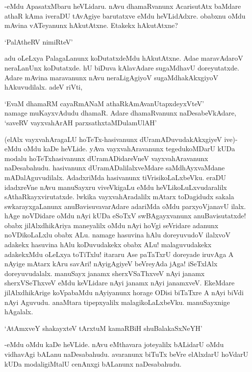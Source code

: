 -eMdu ApasatxMbaru heVLidaru. nAvu dhamaRvanunx AcarisutAtx baMdare athaR kAma iveraDU tAvAgiye barutatxve eMdu heVLidAdxre. obabxnu oMdu mAvina vATeyanunx hAkutAtxne. Etakekx hAkutAtxne?

\begin{shloka}
`PalAtheRV nimiRteV'
\end{shloka}

adu oLeLxya PalagaLanunx koDutatxdeMdu hAkutAtxne. Adae maravAdaroV neraLanUnx koDutatxde. hU biDuva kAlavAdare sugaMdhavU doreyutatxde. Adare mAvina maravanunx nAvu neraLigAgiyoV sugaMdhakAkxgiyoV hAkuvudilalx. adeV riVti,

\begin{shloka}
`EvaM dhamaRM cayaRmANaM athaRkAmAvanUtapxdeyxVteV'\\
namage muKayxvAdudu dhamaR. Adare dhamaRvanunx naDesabeVkAdare,\\
`saveRV vayxvahArAH parxsathxtaMDulamUlAH'
\end{shloka}

(elAlx vayxvahAragaLU hoTeTx-hasivanunx dUramADuvudakAkxgiyeV ive)- eMdu oMdu kaDe heVLide. yAva vayxvahAravanunx tegedukoMDarU kUDa modalu hoTeTxhasivanunx dUramADidareVneV vayxvahAravanunx naDesabahudu. hasivanunx dUramADalilalxveMdare saMdhAyxvaMdane mADalAguvudilalx. AdadxriMda hasivanunx tiVrisikoLaLxbeVku. eraDU idadxreVne nAvu manuSayxru viveVkigaLu eMdu heVLikoLuLxvudaralilx sAthaRkayxvirutatxde. lwkika vayxvahAradalilx mAtarx toDagidudx sakala swkarayxgaLanunx anuBavisuvavarAdare adariMda oMdu parxyoVjanavU ilalx. hAge noVDidare oMdu nAyi kUDa eSoTxV swBAgayxvanunx anuBavisutatxde! obabx jilAlxdhikAriya maneyalilx oMdu nAyi hoVgi seVridare adanunx noVDikoLaLxlu obabx ALu. namage hasuvina hAlu doreyuvudoV ilalxvoV adakekx hasuvina hAlu koDuvudakekx obabx ALu! malaguvudakekx adakekxMdu oLeLxya toTiTxlu! itararu Ase paTaTxrU doreyade iruvAga A nAyige mAtarx kAru savAri! nAyigAgiyeV beVreyAda jAga! iSeTxlAlx doreyuvudalalx. manuSayx janamx sherxVSaThxveV nAyi janamx sherxVSeThxveV eMdu keVLidare nAyi janamx nAyi janamxveV. EkeMdare jilAlxdhikArige koVpabaMdu nAyiyanunx horage ODisi biTaTxre A nAyi biVdi nAyi Aguvudu. anaMtara tipepxyalilx malagikoLaLxbeVku. manuSayxnige hAgalalx.

\begin{shloka}
`AtAmxveY shakayxteV tArxtuM kamaRBiH shuBalakaSxNeYH'
\end{shloka}

-eMdu oMdu kaDe heVLide. nAvu eMthavara joteyalilx bALidarU oMdu vidhavAgi bALanu naDesabahudu. avaranunx biTuTx beVre elAlxdarU hoVdarU kUDa modaligiMtalU cenAnxgi bALanunx naDesabahudu.

